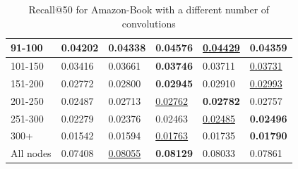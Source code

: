 \begin{table}[]
\begin{tabular}{|l|l|l|l|l|l|}
        91-100    & 0.04202                    & 0.04338                    & \textbf{0.04576}           & \underline{0.04429}        & 0.04359                    \\ \hline
        101-150   & 0.03416                    & 0.03661                    & \textbf{0.03746}           & 0.03711                    & \underline{0.03731}        \\ \hline
        151-200   & 0.02772                    & 0.02800                    & \textbf{0.02945}           & 0.02910                    & \underline{0.02993}        \\ \hline
        201-250   & 0.02487                    & 0.02713                    & \underline{0.02762}        & \textbf{0.02782}           & 0.02757                    \\ \hline
        251-300   & 0.02279                    & 0.02376                    & 0.02463                    & \underline{0.02485}        & \textbf{0.02496}           \\ \hline
        300+      & 0.01542                    & 0.01594                    & \underline{0.01763}        & 0.01735                    & \textbf{0.01790}           \\ \hline
        All nodes & 0.07408                    & \underline{0.08055}        & \textbf{0.08129}           & 0.08033                    & 0.07861                    \\ \hline
    \end{tabular}
    \caption{Recall@50 for Amazon-Book with a different number of convolutions}
    \label{tab:Amazon-book-recall-evaluation-mean}
\end{table}

